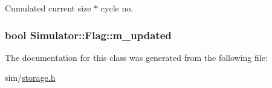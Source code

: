 Cumulated current size $\ast$ cycle no. 

\hypertarget{class_simulator_1_1_flag_a55920339c74aba5925837e4374d54c9a}{
\subsubsection[{m\+\_\+updated}]{\setlength{\rightskip}{0pt plus 5cm}bool Simulator\+::\+Flag\+::m\+\_\+updated\hspace{0.3cm}{\ttfamily [protected]}}}\label{class_simulator_1_1_flag_a55920339c74aba5925837e4374d54c9a}


The documentation for this class was generated from the following file\+:\begin{DoxyCompactItemize}
\item 
sim/\hyperlink{storage_8h}{storage.\+h}\end{DoxyCompactItemize}
